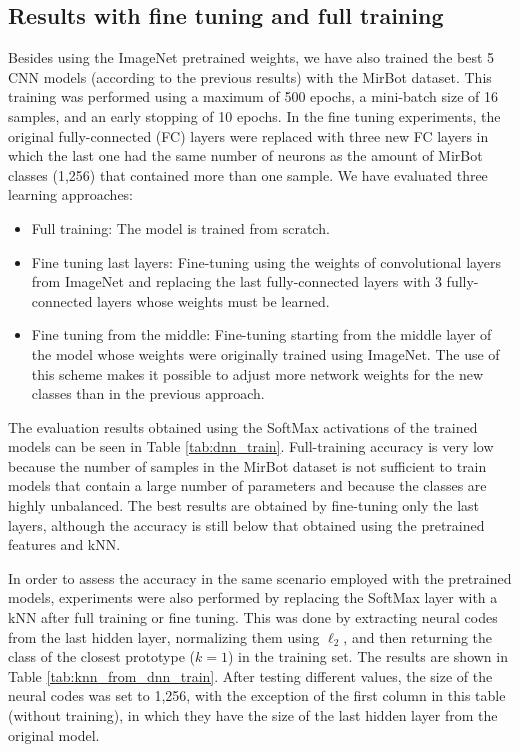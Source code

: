 \documentclass[final, twocolumn]{elsarticle}
\begin{document}
\subsection{Results with fine tuning and full training}

Besides using the ImageNet pretrained weights, we have also trained the best 5 CNN models (according to the previous results) with the MirBot dataset. This training was performed using a maximum of 500 epochs, a mini-batch size of 16 samples, and an early stopping of 10 epochs. In the fine tuning experiments, the original fully-connected (FC) layers were replaced with three new FC layers in which the last one had the same number of neurons as the amount of MirBot classes (1,256) that contained more than one sample. We have evaluated three learning approaches:

\begin{itemize}
\item Full training: The model is trained from scratch. 
\item Fine tuning last layers: Fine-tuning using the weights of convolutional layers from ImageNet and replacing the last fully-connected layers with 3 fully-connected layers whose weights must be learned. 
\item Fine tuning from the middle: Fine-tuning starting from the middle layer of the model whose weights were originally trained using ImageNet. The use of this scheme makes it possible to adjust more network weights for the new classes than in the previous approach.
\end{itemize}

The evaluation results obtained using the SoftMax activations of the trained models can be seen in Table \ref{tab:dnn_train}. Full-training accuracy is very low because the number of samples in the MirBot dataset is not sufficient to train models that contain a large number of parameters and because the classes are highly unbalanced. The best results are obtained by fine-tuning only the last layers, although the accuracy is still below that obtained using the pretrained features and kNN.

In order to assess the accuracy in the same scenario employed with the pretrained models, experiments were also performed by replacing the SoftMax layer with a kNN after full training or fine tuning. This was done by extracting neural codes from the last hidden layer, normalizing them using $\ell_2$, and then returning the class of the closest prototype ($k=1$) in the training set. The results are shown in Table \ref{tab:knn_from_dnn_train}. After testing different values, the size of the neural codes was set to 1,256, with the exception of the first column in this table (without training), in which they have the size of the last hidden layer from the original model. 
\end{document}
